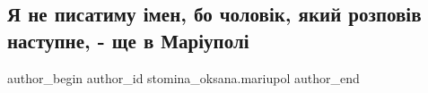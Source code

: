  
 
 
 
 

\subsection{Я не писатиму імен, бо чоловік, який розповів наступне,  - ще в Маріуполі}
\label{sec:06_05_2022.fb.stomina_oksana.mariupol.1.ya_ne_pisatimu__men_}

\ifcmt
 author_begin
   author_id stomina_oksana.mariupol
 author_end
\fi
